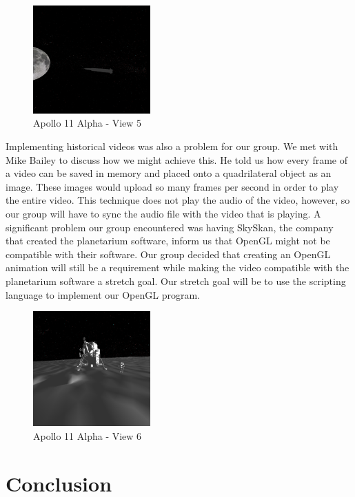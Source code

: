 \documentclass[onecolumn, draftclsnofoot,10pt, compsoc]{IEEEtran}
\begin{document}
\begin{figure}
    \includegraphics[width=0.4\textwidth, right]{View5.PNG} 
    \caption{Apollo 11 Alpha - View 5}
    \label{fig:View 5}
\end{figure}

Implementing historical videos was also a problem for our group. We met with Mike Bailey to discuss how we might achieve this. He told us how every frame of a video can be saved in memory and placed onto a quadrilateral object as an image. These images would upload so many frames per second in order to play the entire video. This technique does not play the audio of the video, however, so our group will have to sync the audio file with the video that is playing. A significant problem our group encountered was having SkySkan, the company that created the planetarium software, inform us that OpenGL might not be compatible with their software. Our group decided that creating an OpenGL animation will still be a requirement while making the video compatible with the planetarium software a stretch goal. Our stretch goal will be to use the scripting language to implement our OpenGL program. 

\begin{figure}
    \includegraphics[width=0.4\textwidth, left]{View6.PNG} 
    \caption{Apollo 11 Alpha - View 6}
    \label{fig:View 6}
\end{figure}


\section{Conclusion}
\end{document}
